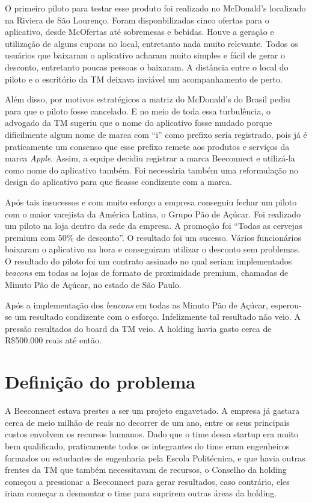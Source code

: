 O primeiro piloto para testar esse produto foi realizado no McDonald's localizado na Riviera de São Lourenço. Foram disponbilizadas cinco ofertas para o aplicativo, desde McOfertas até sobremesas e bebidas.
Houve a geração e utilização de alguns cupons no local, entretanto nada muito relevante. Todos os usuários que baixaram o aplicativo acharam muito simples e fácil de gerar o desconto, entretanto poucas pessoas o baixaram. A distância entre o local do piloto e o escritório da TM deixava inviável um acompanhamento de perto. 

Além disso, por motivos estratégicos a matriz do McDonald's do Brasil pediu para que o piloto fosse cancelado. E no meio de toda essa turbulência, o advogado da TM sugeriu que o nome do aplicativo fosse mudado porque dificilmente algum nome de marca com \enquote{i} como prefixo seria registrado, pois já é praticamente um consenso que esse prefixo remete aos produtos e serviços da marca \textit{Apple}. Assim, a equipe decidiu registrar a marca Beeconnect e utilizá-la como nome do aplicativo também. Foi necessária também uma reformulação no design do aplicativo para que ficasse condizente com a marca.

Após tais insucessos e com muito esforço a empresa conseguiu fechar um piloto com o maior varejista da América Latina, o Grupo Pão de Açúcar. Foi realizado um piloto na loja dentro da sede da empresa. A promoção foi \enquote{Todas as cervejas premium com 50\% de desconto}. O resultado foi um sucesso. Vários funcionários baixaram o aplicativo na hora e conseguiram utilizar o desconto sem problemas. O resultado do piloto foi um contrato assinado no qual seriam implementados \textit{beacons} em todas as lojas de formato de proximidade premium, chamadas de Minuto Pão de Açúcar, no estado de São Paulo.

Após a implementação dos \textit{beacons} em todas as Minuto Pão de Açúcar, esperou-se um resultado condizente com o esforço. Infelizmente tal resultado não veio. A pressão resultados do board da TM veio. A holding havia gasto cerca de R\$500.000 reais até então.

\section{Definição do problema}
\label{cha:definição_do_problema}
A Beeconnect estava prestes a ser um projeto engavetado. A empresa já gastara cerca de meio milhão de reais no decorrer de um ano, entre os seus principais custos envolvem os recursos humanos. Dado que o time dessa startup era muito bem qualificado, praticamente todos os integrantes do time eram engenheiros formados ou estudantes de engenharia pela Escola Politécnica, e que havia outras frentes da TM que também necessitavam de recursos, o Conselho da holding começou a pressionar a Beeconnect para gerar resultados, caso contrário, eles iriam começar a desmontar o time para suprirem outras áreas da holding.

